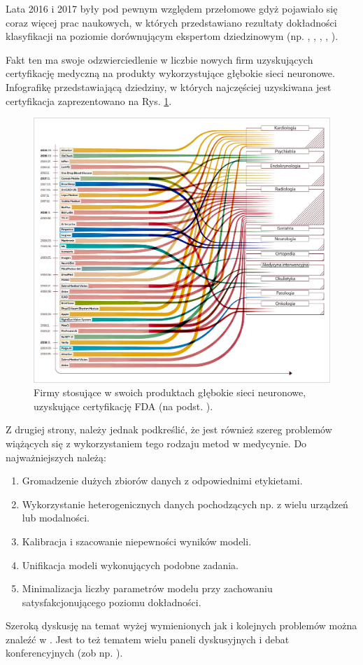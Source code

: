 Lata 2016 i 2017 były pod pewnym względem przełomowe gdyż pojawiało się coraz więcej prac naukowych, w których przedstawiano rezultaty dokładności klasyfikacji na poziomie dorównującym ekspertom dziedzinowym (np. \cite{Gulshan2016}, \cite{Esteva2017}, \cite{Tajbakhsh2016} \cite{Erickson2018}, \cite{LungChalenge}, \cite{Christiansen2018, Sarraf2016, Glasser2016, 2016arXiv160605718W}).

Fakt ten ma swoje odzwierciedlenie w liczbie nowych firm uzyskujących certyfikację medyczną na produkty wykorzystujące głębokie sieci neuronowe. Infografikę przedstawiającą dziedziny, w których najczęściej uzyskiwana jest certyfikacja zaprezentowano na Rys. \ref{fda_cert}.

\begin{figure}[h!]
	\centering
	\includegraphics[width=1\textwidth]{figures/fda_for_ai.jpg}
	\caption{Firmy stosujące w swoich produktach głębokie sieci neuronowe, uzyskujące certyfikację FDA (na podst. \cite{FDA}).}
	\label{fda_cert}
\end{figure}
\newpage
Z drugiej strony, należy jednak podkreślić, że jest również szereg problemów wiążących się z wykorzystaniem tego rodzaju metod w medycynie. Do najważniejszych należą:
\begin{enumerate}
	\item Gromadzenie dużych zbiorów danych z odpowiednimi etykietami.
	\item Wykorzystanie heterogenicznych danych pochodzących np. z wielu urządzeń lub modalności.
	\item Kalibracja i szacowanie niepewności wyników modeli.
	\item Unifikacja modeli wykonujących podobne zadania.
	\item Minimalizacja liczby parametrów modelu przy zachowaniu satysfakcjonującego poziomu dokładności.
\end{enumerate}
Szeroką dyskusję na temat wyżej wymienionych jak i kolejnych problemów można znaleźć w \cite{Marcus2018}. Jest to też tematem wielu paneli dyskusyjnych i debat konferencyjnych (zob np. \cite{NVIDIApanel}). 

